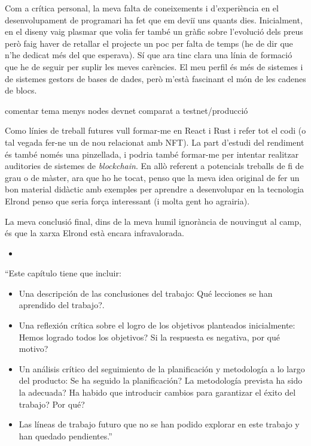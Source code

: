 \documentclass[11pt,a4paper]{article}
\begin{document}
Com a crítica personal, la meva falta de coneixements i d'experiència en el desenvolupament de programari ha fet que em deviï uns quants dies. Inicialment, en el diseny vaig plasmar que volia fer també un gràfic sobre l'evolució dels preus però faig haver de retallar el projecte un poc per falta de temps (he de dir que n'he dedicat més del que esperava). Sí que ara tinc clara una línia de formació que he de seguir per suplir les meves carències. El meu perfil és més de sistemes i de sistemes gestors de bases de dades, però m'està fascinant el món de les cadenes de blocs.

comentar tema menys nodes devnet comparat a testnet/producció

Como línies de treball futures vull formar-me en React i Rust i refer tot el codi (o tal vegada fer-ne un de nou relacionat amb NFT). La part d'estudi del rendiment és també només una pinzellada, i podria també formar-me per intentar realitzar auditories de sistemes de \textit{blockchain}. En allò referent a potencials treballs de fi de grau o de màster, ara que ho he tocat, penso que la meva idea original de fer un bon material didàctic amb exemples per aprendre a desenvolupar en la tecnologia Elrond penso que seria força interessant (i molta gent ho agrairia).

La meva conclusió final, dins de la meva humil ignorància de nouvingut al camp, és que la xarxa Elrond està encara infravalorada.

\begin{itemize}
\item 
\end{itemize}

 
``Este capítulo tiene que incluir:
\begin{itemize}
\item Una descripción de las conclusiones del trabajo: Qué lecciones se han aprendido del trabajo?.
\item Una reflexión crítica sobre el logro de los objetivos planteados inicialmente: Hemos logrado todos los objetivos? Si la respuesta es negativa, por qué motivo? 
\item Un análisis crítico del seguimiento de la planificación y metodología a lo largo del producto: Se ha seguido la planificación? La metodología prevista ha sido la adecuada? Ha habido que introducir cambios para garantizar el éxito del trabajo? Por qué? 
\item Las líneas de trabajo futuro que no se han podido explorar en este trabajo y han quedado pendientes.''
\end{itemize}
\end{document}
